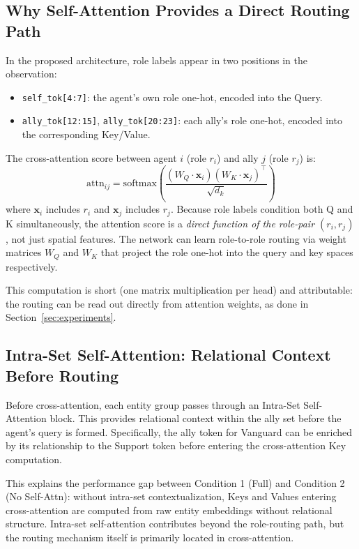 \subsection{Why Self-Attention Provides a Direct Routing Path}

In the proposed architecture, role labels appear in two positions in the observation:
\begin{itemize}
  \item \texttt{self\_tok[4:7]}: the agent's own role one-hot, encoded into the Query.
  \item \texttt{ally\_tok[12:15]}, \texttt{ally\_tok[20:23]}: each ally's role one-hot, encoded into the corresponding Key/Value.
\end{itemize}

The cross-attention score between agent $i$ (role $r_i$) and ally $j$ (role $r_j$) is:
\[
\text{attn}_{ij} = \text{softmax}\!\left(\frac{(W_Q \cdot \mathbf{x}_i)(W_K \cdot \mathbf{x}_j)^\top}{\sqrt{d_k}}\right)
\]
where $\mathbf{x}_i$ includes $r_i$ and $\mathbf{x}_j$ includes $r_j$. Because role labels condition both Q and K simultaneously, the attention score is a \emph{direct function of the role-pair $(r_i, r_j)$}, not just spatial features. The network can learn role-to-role routing via weight matrices $W_Q$ and $W_K$ that project the role one-hot into the query and key spaces respectively.

This computation is short (one matrix multiplication per head) and attributable: the routing can be read out directly from attention weights, as done in Section~\ref{sec:experiments}.

\subsection{Intra-Set Self-Attention: Relational Context Before Routing}

Before cross-attention, each entity group passes through an Intra-Set Self-Attention block. This provides relational context within the ally set before the agent's query is formed. Specifically, the ally token for Vanguard can be enriched by its relationship to the Support token before entering the cross-attention Key computation.

This explains the performance gap between Condition 1 (Full) and Condition 2 (No Self-Attn): without intra-set contextualization, Keys and Values entering cross-attention are computed from raw entity embeddings without relational structure. Intra-set self-attention contributes beyond the role-routing path, but the routing mechanism itself is primarily located in cross-attention.

